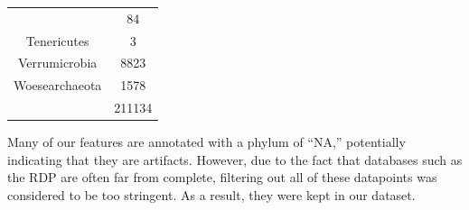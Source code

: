 \documentclass[12pt,twoside]{dukestatscithesis}
\begin{document}
\begin{longtable}[]{@{}cc@{}}
\begin{minipage}[t]{0.39\columnwidth}
\end{minipage} & \begin{minipage}[t]{0.20\columnwidth}\centering\strut
84\strut
\end{minipage}\tabularnewline
\begin{minipage}[t]{0.39\columnwidth}\centering\strut
Tenericutes\strut
\end{minipage} & \begin{minipage}[t]{0.20\columnwidth}\centering\strut
3\strut
\end{minipage}\tabularnewline
\begin{minipage}[t]{0.39\columnwidth}\centering\strut
Verrumicrobia\strut
\end{minipage} & \begin{minipage}[t]{0.20\columnwidth}\centering\strut
8823\strut
\end{minipage}\tabularnewline
\begin{minipage}[t]{0.39\columnwidth}\centering\strut
Woesearchaeota\strut
\end{minipage} & \begin{minipage}[t]{0.20\columnwidth}\centering\strut
1578\strut
\end{minipage}\tabularnewline
\begin{minipage}[t]{0.39\columnwidth}\centering\strut
\strut
\end{minipage} & \begin{minipage}[t]{0.20\columnwidth}\centering\strut
211134\strut
\end{minipage}\tabularnewline
\bottomrule
\end{longtable}
Many of our features are annotated with a phylum of ``NA,'' potentially
indicating that they are artifacts. However, due to the fact that
databases such as the RDP are often far from complete, filtering out all
of these datapoints was considered to be too stringent. As a result,
they were kept in our dataset.
\end{document}

